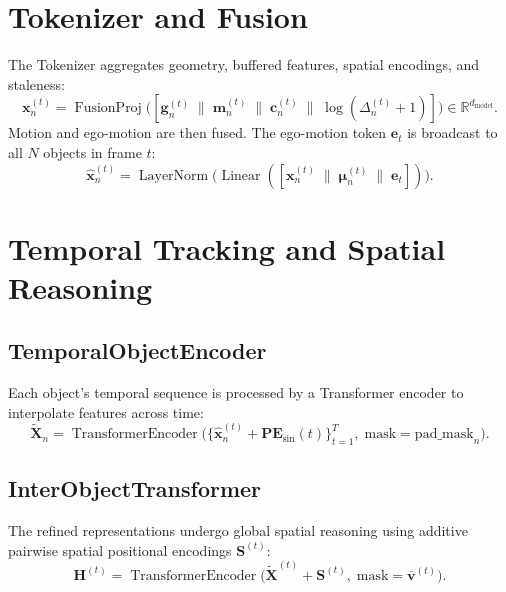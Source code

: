 \documentclass{article}
\newcommand{\mR}{\mathbb{R}}
\newcommand{\op}[1]{\operatorname{#1}}
\newcommand{\mat}[1]{\bm{#1}}
\begin{document}
\section{Tokenizer and Fusion}
\label{sec:fusion}

The Tokenizer aggregates geometry, buffered features, spatial encodings, and staleness:
\begin{equation}
    \mat{x}_n^{(t)} = \op{FusionProj}\bigl([\mat{g}_n^{(t)} \;\|\; \mat{m}_n^{(t)} \;\|\; \mat{c}_n^{(t)} \;\|\; \log(\Delta_n^{(t)} + 1)]\bigr) \in \mR^{d_{\text{model}}}.
    \label{eq:tokenizer}
\end{equation}
Motion and ego-motion are then fused. The ego-motion token $\mat{e}_t$ is broadcast to all $N$ objects in frame $t$:
\begin{equation}
    \hat{\mat{x}}_n^{(t)} = \op{LayerNorm}\bigl(\op{Linear}([\mat{x}_n^{(t)} \;\|\; \mat{\mu}_n^{(t)} \;\|\; \mat{e}_t])\bigr).
    \label{eq:fusion}
\end{equation}


\section{Temporal Tracking and Spatial Reasoning}
\label{sec:tracking}

\subsection{TemporalObjectEncoder}
Each object's temporal sequence is processed by a Transformer encoder to interpolate features across time:
\begin{equation}
    \tilde{\mat{X}}_n = \op{TransformerEncoder}\bigl(\{\hat{\mat{x}}_n^{(t)} + \mat{PE}_{\text{sin}}(t)\}_{t=1}^T,\; \text{mask}=\text{pad\_mask}_n\bigr).
    \label{eq:toe}
\end{equation}

\subsection{InterObjectTransformer}
The refined representations undergo global spatial reasoning using additive pairwise spatial positional encodings $\mat{S}^{(t)}$:
\begin{equation}
    \mat{H}^{(t)} = \op{TransformerEncoder}\bigl(\tilde{\mat{X}}^{(t)} + \mat{S}^{(t)},\; \text{mask}=\overline{\mat{v}}^{(t)}\bigr).
    \label{eq:iot}
\end{equation}
\end{document}
